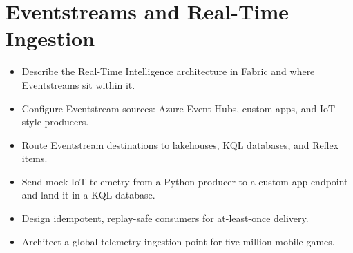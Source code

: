 \chapter{Eventstreams and Real-Time Ingestion}
%

\begin{objectives}
\begin{itemize}
    \item Describe the Real-Time Intelligence architecture in Fabric and where Eventstreams sit within it.
    \item Configure Eventstream sources: Azure Event Hubs, custom apps, and IoT-style producers.
    \item Route Eventstream destinations to lakehouses, KQL databases, and Reflex items.
    \item Send mock IoT telemetry from a Python producer to a custom app endpoint and land it in a KQL database.
    \item Design idempotent, replay-safe consumers for at-least-once delivery.
    \item Architect a global telemetry ingestion point for five million mobile games.
\end{itemize}
\end{objectives}

